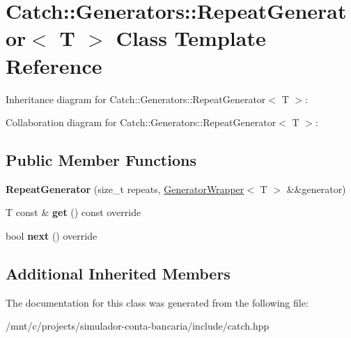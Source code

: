 \hypertarget{classCatch_1_1Generators_1_1RepeatGenerator}{}\section{Catch\+:\+:Generators\+:\+:Repeat\+Generator$<$ T $>$ Class Template Reference}
\label{classCatch_1_1Generators_1_1RepeatGenerator}


Inheritance diagram for Catch\+:\+:Generators\+:\+:Repeat\+Generator$<$ T $>$\+:


Collaboration diagram for Catch\+:\+:Generators\+:\+:Repeat\+Generator$<$ T $>$\+:
\subsection*{Public Member Functions}
\begin{DoxyCompactItemize}
\item 
\mbox{\label{classCatch_1_1Generators_1_1RepeatGenerator_a3aee12c4f9c2c04823ca3c75a20f234f}} 
{\bfseries Repeat\+Generator} (size\+\_\+t repeats, \hyperlink{classCatch_1_1Generators_1_1GeneratorWrapper}{Generator\+Wrapper}$<$ T $>$ \&\&generator)
\item 
\mbox{\label{classCatch_1_1Generators_1_1RepeatGenerator_a43bd573274c9a0cd7f4406a3d0d36d49}} 
T const  \& {\bfseries get} () const override
\item 
\mbox{\label{classCatch_1_1Generators_1_1RepeatGenerator_a24d5c2b1c09d6d220d4bd4c83f222dcb}} 
bool {\bfseries next} () override
\end{DoxyCompactItemize}
\subsection*{Additional Inherited Members}


The documentation for this class was generated from the following file\+:\begin{DoxyCompactItemize}
\item 
/mnt/c/projects/simulador-\/conta-\/bancaria/include/catch.\+hpp\end{DoxyCompactItemize}
